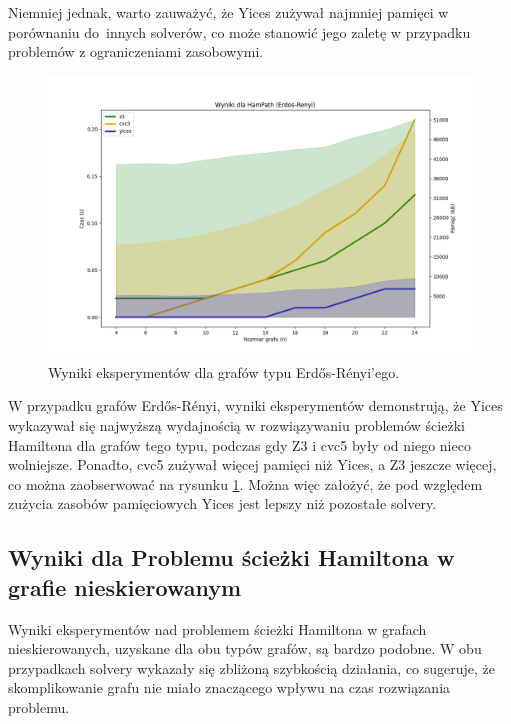 Niemniej jednak, warto zauważyć, że Yices zużywał najmniej pamięci w porównaniu do~innych solverów, co może stanowić jego zaletę w przypadku problemów z ograniczeniami zasobowymi.

\begin{figure}[htbp]
	\centering
	\begin{minipage}{\textwidth}
		\includegraphics[width=\textwidth]{./figures/1-erdos-renyi-plot.png}
		\caption{Wyniki eksperymentów dla grafów typu  Erdős-Rényi'ego.}
		\label{fig:1-erdos-renyi-plot}
	\end{minipage}
\end{figure}

W przypadku grafów Erdős-Rényi, wyniki eksperymentów demonstrują, że Yices wykazywał się najwyższą wydajnością w rozwiązywaniu problemów ścieżki Hamiltona dla grafów tego typu, podczas gdy Z3 i cvc5 były od niego nieco wolniejsze. Ponadto, cvc5 zużywał więcej pamięci niż Yices, a Z3 jeszcze więcej, co można zaobserwować na rysunku \ref{fig:1-erdos-renyi-plot}. Można więc założyć, że pod względem zużycia zasobów pamięciowych Yices jest lepszy niż pozostałe solvery.

\subsection{Wyniki dla Problemu ścieżki Hamiltona w grafie nieskierowanym}

Wyniki eksperymentów nad problemem ścieżki Hamiltona w grafach nieskierowanych, uzyskane dla obu typów grafów, są bardzo podobne. W obu przypadkach solvery wykazały się zbliżoną szybkością działania, co sugeruje, że skomplikowanie grafu nie miało znaczącego wpływu na czas rozwiązania problemu.

